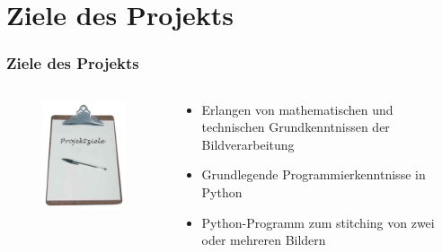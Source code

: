 \documentclass[aspectratio=43, 11pt]{beamer}
\begin{document}
  \section{Ziele des Projekts}

    \begin{frame}
      \frametitle{Ziele des Projekts}
      \begin{columns}
        \begin{column}{0.48\textwidth}
          \begin{figure}
            \includegraphics[scale = 0.53]{images/projektziele.jpg}
          \end{figure}
        \end{column}
        \begin{column}{0.5\textwidth}
          \begin{itemize}
            \item Erlangen von mathematischen und technischen Grundkenntnissen der Bildverarbeitung
            \item Grundlegende Programmierkenntnisse in Python
            \item Python-Programm zum stitching von zwei oder mehreren Bildern
          \end{itemize}
        \end{column}
      \end{columns}
    \end{frame}
\end{document}
